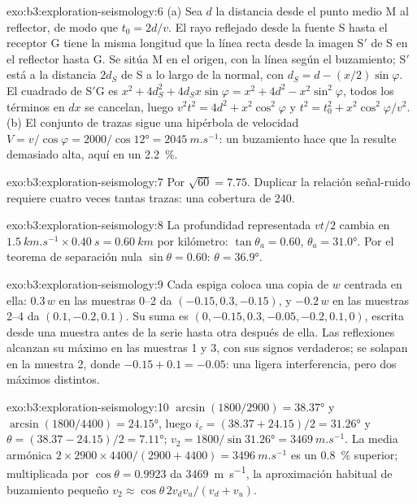 \begin{solution}{exo:b3:exploration-seismology:6}
(a) Sea $d$ la distancia desde el punto medio M al reflector, de modo que
$t_0 = 2d/v$. El rayo reflejado desde la fuente S hasta el receptor G tiene la misma longitud que
la línea recta desde la imagen S$'$ de S en el reflector hasta G. Se sitúa M en
el origen, con la línea según el buzamiento; S$'$ está a la distancia $2d_S$ de S a lo largo
de la normal, con $d_S = d - (x/2)\sin\varphi$. El cuadrado de S$'$G es
$x^2 + 4d_S^2 + 4d_Sx\sin\varphi = x^2 + 4d^2 - x^2\sin^2\varphi$, todos los términos
en $dx$ se cancelan, luego $v^2t^2 = 4d^2 + x^2\cos^2\varphi$ y
$t^2 = t_0^2 + x^2\cos^2\varphi/v^2$. (b) El conjunto de trazas sigue una hipérbola de velocidad
$V = v/\cos\varphi = 2000/\cos\ang{12} = \qty{2045}{m.s^{-1}}$: un buzamiento hace que la
 resulte demasiado alta, aquí en un \qty{2.2}{\percent}.
\end{solution}

\begin{solution}{exo:b3:exploration-seismology:7}
Por $\sqrt{60} = 7.75$. Duplicar la relación señal-ruido requiere cuatro veces tantas
trazas: una cobertura de 240.
\end{solution}

\begin{solution}{exo:b3:exploration-seismology:8}
La profundidad representada $vt/2$ cambia en $\qty{1.5}{km.s^{-1}}\times\qty{0.40}{s}
= \qty{0.60}{km}$ por kilómetro: $\tan\theta_a = 0.60$, $\theta_a = \ang{31.0}$.
Por el teorema de separación nula $\sin\theta = 0.60$: $\theta = \ang{36.9}$.
\end{solution}

\begin{solution}{exo:b3:exploration-seismology:9}
Cada espiga coloca una copia de $w$ centrada en ella: $0.3\,w$ en las muestras 0--2 da
$(-0.15, 0.3, -0.15)$, y $-0.2\,w$ en las muestras 2--4 da $(0.1, -0.2, 0.1)$.
Su suma es $(0, -0.15, 0.3, -0.05, -0.2, 0.1, 0)$, escrita desde una muestra
antes de la serie hasta otra después de ella. Las reflexiones alcanzan su máximo en las muestras 1 y 3, con
sus signos verdaderos; se solapan en la muestra 2, donde $-0.15 + 0.1 = -0.05$: una
ligera interferencia, pero dos máximos distintos.
\end{solution}

\begin{solution}{exo:b3:exploration-seismology:10}
$\arcsin(1800/2900) = \ang{38.37}$ y $\arcsin(1800/4400) = \ang{24.15}$, luego
$i_c = (38.37 + 24.15)/2 = \ang{31.26}$ y $\theta = (38.37 - 24.15)/2 =
\ang{7.11}$; $v_2 = 1800/\sin\ang{31.26} = \qty{3469}{m.s^{-1}}$. La media armónica
$2\times2900\times4400/(2900 + 4400) = \qty{3496}{m.s^{-1}}$ es
un \qty{0.8}{\percent} superior; multiplicada por $\cos\theta = 0.9923$ da
\qty{3469}{m.s^{-1}}, la aproximación habitual de buzamiento pequeño
$v_2 \approx \cos\theta\,2v_dv_u/(v_d + v_u)$.
\end{solution}

